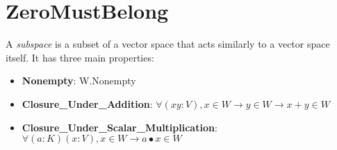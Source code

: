 \section{ZeroMustBelong}


\begin{definition}
  \label{definition : Subspace}
  \leanok
  A \emph{subspace} is a subset of a vector space that acts similarly to a vector space itself. It has three main properties:
  \begin{itemize}
    \item \textbf{Nonempty}:
    W.Nonempty
    \item \textbf{Closure\_Under\_Addition}:
    $\forall (x y : V), x ∈ W \rightarrow y \in W \rightarrow x + y \in W$
    \item \textbf{Closure\_Under\_Scalar\_Multiplication}:
    $\forall (a : K) (x : V), x \in W \rightarrow a \bullet x \in W$
  \end{itemize}
\end{definition}